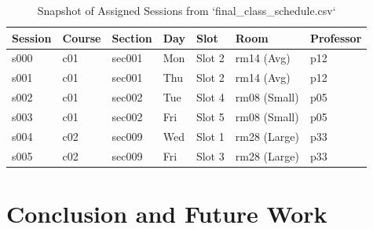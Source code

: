 \documentclass[12pt,a4paper]{report}
\begin{document}
\begin{table}[H]
  \centering
  \small
  \caption{Snapshot of Assigned Sessions from `final_class_schedule.csv`}
  \label{tab:schedule_snapshot_prism}
  \begin{tabularx}{\linewidth}{C{1.8cm} C{1.8cm} C{1.8cm} C{2.0cm} C{1.8cm} C{2.0cm} C{2.0cm}}
    \toprule
    \color{PrismWhite}\textbf{Session} & 
    \color{PrismWhite}\textbf{Course} & 
    \color{PrismWhite}\textbf{Section} & 
    \color{PrismWhite}\textbf{Day} & 
    \color{PrismWhite}\textbf{Slot} & 
    \color{PrismWhite}\textbf{Room} & 
    \color{PrismWhite}\textbf{Professor} \\
    \midrule
    s000 & c01 & sec001 & Mon & Slot 2 & rm14 (Avg) & p12 \\
    s001 & c01 & sec001 & Thu & Slot 2 & rm14 (Avg) & p12 \\
    s002 & c01 & sec002 & Tue & Slot 4 & rm08 (Small) & p05 \\
    s003 & c01 & sec002 & Fri & Slot 5 & rm08 (Small) & p05 \\
    s004 & c02 & sec009 & Wed & Slot 1 & rm28 (Large) & p33 \\
    s005 & c02 & sec009 & Fri & Slot 3 & rm28 (Large) & p33 \\
    \bottomrule
  \end{tabularx}
\end{table}

\chapter{Conclusion and Future Work}
\end{document}
